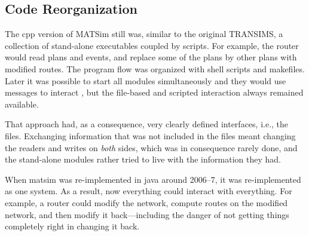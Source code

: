 

%


\subsection{Code Reorganization}
\label{sec:matsim-core-reorg}

The \gls{cpp} version of MATSim still was, similar to the original TRANSIMS, a collection of stand-alone executables coupled by scripts.  For example, the router would read plans and events, and replace some of the plans by other plans with modified routes.  The program flow was organized with shell scripts and makefiles.  Later it was possible to start all modules simultaneously and they would use messages to interact \citep[also see][]{GloorNagel2005ped-att04-birkh}, but the file-based and scripted interaction always remained available.

That approach had, as a consequence, very clearly defined interfaces, i.e., the files. Exchanging information that was not included in the files meant changing the readers and writes on \emph{both} sides, which was in consequence rarely done, and the stand-alone modules rather tried to live with the information they had.

When \acrshort{matsim} was re-implemented in \gls{java} around 2006--7, it was re-implemented as one system.  As a result, now everything could interact with everything.  For example, a router could modify the network, compute routes on the modified network, and then modify it back---including the danger of not getting things completely right in changing it back.  

